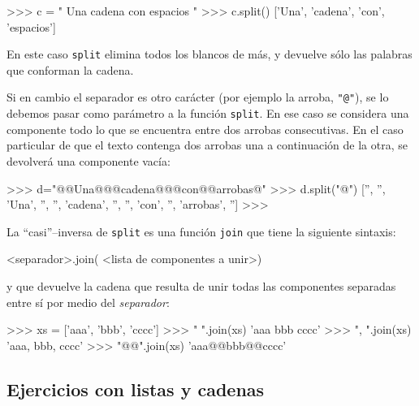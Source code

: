 \begin{codigo-python-sn}
>>> c = "   Una    cadena   con    espacios    "
>>> c.split()
['Una', 'cadena', 'con', 'espacios']
\end{codigo-python-sn}

En este caso \lstinline!split! elimina todos los blancos de más, y devuelve
sólo las palabras que conforman la cadena.

Si en cambio el separador es otro carácter (por ejemplo la arroba,
\lstinline!"@"!), se lo debemos pasar como parámetro a la función
\lstinline!split!. En ese caso se considera una componente todo lo que se
encuentra entre dos arrobas consecutivas. En el caso particular de que el
texto contenga dos arrobas una a continuación de la otra, se devolverá una
componente vacía:

\begin{codigo-python-sn}
>>> d="@@Una@@@cadena@@@con@@arrobas@"
>>> d.split("@")
['', '', 'Una', '', '', 'cadena', '', '', 'con', '', 'arrobas', '']
>>>
\end{codigo-python-sn}

La ``casi''--inversa de \lstinline!split! es una función \lstinline!join!
que tiene la siguiente sintaxis:

\begin{codigo-python-sn}
<separador>.join( <lista de componentes a unir>)
\end{codigo-python-sn}

y que devuelve la cadena que resulta de unir todas las componentes
separadas entre sí por medio del {\it separador}:

\begin{codigo-python-sn}
>>> xs = ['aaa', 'bbb', 'cccc']
>>> " ".join(xs)
'aaa bbb cccc'
>>> ", ".join(xs)
'aaa, bbb, cccc'
>>> "@@".join(xs)
'aaa@@bbb@@cccc'
\end{codigo-python-sn}

\subsection{Ejercicios con listas y cadenas}


